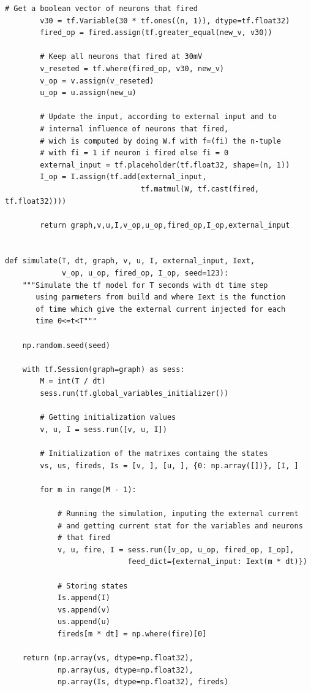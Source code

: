 \documentclass[12pt]{scrartcl}
\begin{document}
\begin{lstlisting}[caption = {Numpy vs Tensorflow : Implémentation Tensorflow}]
        # Get a boolean vector of neurons that fired
        v30 = tf.Variable(30 * tf.ones((n, 1)), dtype=tf.float32)
        fired_op = fired.assign(tf.greater_equal(new_v, v30))

        # Keep all neurons that fired at 30mV
        v_reseted = tf.where(fired_op, v30, new_v)
        v_op = v.assign(v_reseted)
        u_op = u.assign(new_u)

        # Update the input, according to external input and to
        # internal influence of neurons that fired, 
        # wich is computed by doing W.f with f=(fi) the n-tuple
        # with fi = 1 if neuron i fired else fi = 0
        external_input = tf.placeholder(tf.float32, shape=(n, 1))
        I_op = I.assign(tf.add(external_input,
                               tf.matmul(W, tf.cast(fired, tf.float32))))

        return graph,v,u,I,v_op,u_op,fired_op,I_op,external_input


def simulate(T, dt, graph, v, u, I, external_input, Iext,
             v_op, u_op, fired_op, I_op, seed=123):
    """Simulate the tf model for T seconds with dt time step 
       using parmeters from build and where Iext is the function
       of time which give the external current injected for each 
       time 0<=t<T"""

    np.random.seed(seed)

    with tf.Session(graph=graph) as sess:
        M = int(T / dt)
        sess.run(tf.global_variables_initializer())

        # Getting initialization values
        v, u, I = sess.run([v, u, I])

        # Initialization of the matrixes containg the states
        vs, us, fireds, Is = [v, ], [u, ], {0: np.array([])}, [I, ]

        for m in range(M - 1):

            # Running the simulation, inputing the external current
            # and getting current stat for the variables and neurons
            # that fired
            v, u, fire, I = sess.run([v_op, u_op, fired_op, I_op],
                            feed_dict={external_input: Iext(m * dt)})

            # Storing states
            Is.append(I)
            vs.append(v)
            us.append(u)
            fireds[m * dt] = np.where(fire)[0]

    return (np.array(vs, dtype=np.float32), 
            np.array(us, dtype=np.float32),
            np.array(Is, dtype=np.float32), fireds)
\end{lstlisting}
\end{document}
